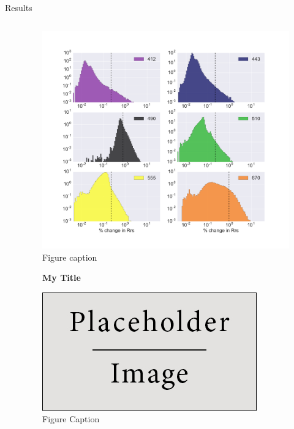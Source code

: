 \documentclass[final]{beamer}
\newlength{\onecolwid}
\newlength{\twocolwid}
\begin{document}
\begin{frame}[t]
\begin{columns}[t]
\begin{column}{\twocolwid}
\begin{block}{Results}
\begin{columns}[t,totalwidth=\twocolwid]
\begin{column}{\onecolwid}
\end{column} %

\begin{column}{\onecolwid}\vspace{-.6in} %


\begin{figure}
\includegraphics[width=1.1\linewidth]{Propagation490.pdf}
\\{Figure caption}
\end{figure}

\begin{figure}
\centering
\textbf{My Title}\par\medskip
\includegraphics[width=0.8\linewidth]{placeholder.jpg}
\\{Figure Caption}
\end{figure}


\end{column}
\end{columns}
\end{block}
\end{column}
\end{columns}
\end{frame}
\end{document}
